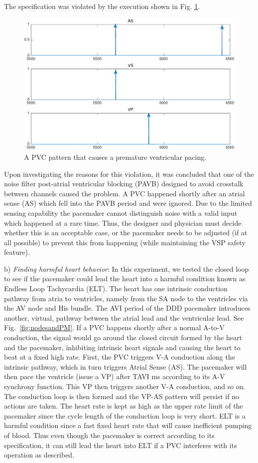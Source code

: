The specification was violated by the execution shown in Fig. \ref{fig:bug8_kept1}.
\begin{figure}[tb]
\centering
\includegraphics[width=0.7\linewidth]{figures/bug8_kept1}
\caption{A PVC pattern that causes a premature ventricular pacing.}
\label{fig:bug8_kept1}
\end{figure}
Upon investigating the reasons for this violation, it was concluded that one of the noise filter post-atrial ventricular blocking (PAVB) designed to avoid crosstalk between channels caused the problem.  A PVC happened shortly after an atrial sense (AS) which fell into the PAVB period and were ignored. Due to the limited sensing capability the pacemaker cannot distinguish noise with a valid input which happened at a rare time.
Thus, the designer and physician must decide whether this is an acceptable case, or the pacemaker needs to be adjusted (if at all possible) to prevent this from happening (while maintaining the VSP safety feature).

b) \emph{Finding harmful heart behavior}: In this experiment, we tested the closed loop to see if the pacemaker could lead the heart into a harmful condition known as Endless Loop Tachycardia (ELT).
%
The heart has one intrinsic conduction pathway from atria to ventricles, namely from the SA node to the ventricles via the AV node and His bundle.
The AVI period of the DDD pacemaker introduces another, virtual, pathway between the atrial lead and the ventricular lead.
See Fig.~\ref{fig:nodesandPM}.
If a PVC happens shortly after a normal A-to-V conduction, the signal would go around the closed circuit formed by the heart and the pacemaker, inhibiting intrinsic heart signals and causing the heart to beat at a fixed high rate.
First, the PVC triggers V-A conduction along the intrinsic pathway, 
which in turn triggers Atrial Sense (AS). 
The pacemaker will then pace the ventricle (issue a VP) after TAVI ms according to its A-V synchrony function. 
This VP then triggers another V-A conduction, and so on.
The conduction loop is then formed and the VP-AS pattern will persist if no actions are taken.
The heart rate is kept as high as the upper rate limit of the pacemaker since the cycle length of the conduction loop is very short. 
ELT is a harmful condition since a fast fixed heart rate that will cause inefficient pumping of blood.
Thus even though the pacemaker is correct according to its specification, it can still lead the heart into ELT if a PVC interferes with its operation as described.
%

